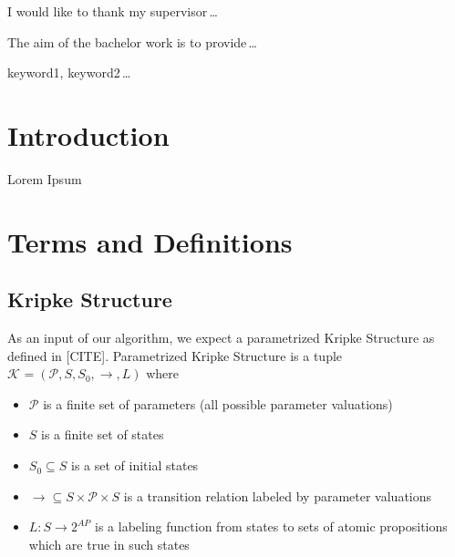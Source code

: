 \documentclass[12pt,oneside,draft]{fithesis2}
\newcommand{\ks}[1][]{\ensuremath{\mathcal{K}_{#1}}}
\newcommand{\fullKs}{\ensuremath{ \ks = (\params, S, S_0, \trans{}, L) }}
\newcommand{\trans}[1]{\stackrel{#1}{\rightarrow}}
\newcommand{\params}{\mathcal{P}}
\begin{document}
  \FrontMatter                    %
    \ThesisTitlePage                %
    \begin{ThesisDeclaration}       %
      \DeclarationText
      \AdvisorName
    \end{ThesisDeclaration}
    \begin{ThesisThanks}            %
      I would like to thank my supervisor\,\dots
    \end{ThesisThanks}
    \begin{ThesisAbstract}          %
      The aim of the bachelor work is to provide\,\dots
    \end{ThesisAbstract}
    \begin{ThesisKeyWords}          %
      keyword1, keyword2\,\dots
    \end{ThesisKeyWords}
    \tableofcontents                %
  
  \MainMatter                     %
    \chapter{Introduction}          %
	Lorem Ipsum \cite{testCite}

	\chapter{Terms and Definitions}
		
		\section{Kripke Structure}
	
			As an input of our algorithm, we expect a parametrized Kripke Structure as defined in [CITE]. Parametrized Kripke Structure is a tuple $\fullKs$ where
			
			\begin{itemize}
				\item $\params$ is a finite set of parameters (all possible parameter valuations)
				\item $S$ is a finite set of states
				\item $S_0 \subseteq S$ is a set of initial states
				\item $\trans{} \subseteq S \times \params \times S$ is a transition relation labeled by parameter valuations 
				\item $L: S \rightarrow 2^{AP} $ is a labeling function from states to sets of atomic propositions which are true in such states
			\end{itemize} 		
			
\end{document}
